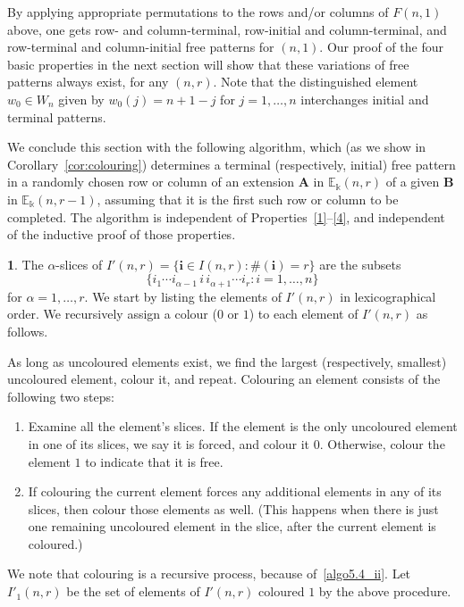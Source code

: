 \documentclass[10pt]{article}
\theoremstyle{definition}
\newtheorem{dynamicenonce}[theorem]{\scaffoldenoncename}
\newenvironment{enonce}[2][]{\def\scaffoldenoncename{#2}\begin{dynamicenonce}}{\end{dynamicenonce}}
\newcommand{\E}{\mathbb{E}}
\newcommand{\bi}{{\boldsymbol{i}}} %
\newcommand{\bA}{\mathbf{A}}
\newcommand{\bB}{\mathbf{B}}
\newenvironment{algorithm}{\begin{enonce}{Algorithm}}{\end{enonce}} %
\begin{document}
By applying appropriate permutations to the rows and/or columns of
$F(n,1)$ above, one gets row- and column-terminal, row-initial and
column-terminal, and row-terminal and column-initial free patterns for
$(n,1)$. Our proof of the four basic properties in the next section
will show that these variations of free patterns always exist, for any
$(n,r)$. Note that the distinguished element $w_0 \in W_n$ given by
$w_0(j) = n+1-j$ for $j = 1, \dots, n$ interchanges initial and
terminal patterns.


We conclude this section with the following algorithm, which (as we
show in Corollary~\ref{cor:colouring}) determines a terminal
(respectively, initial) free pattern in a randomly chosen row or
column of an extension $\bA$ in $\E_\Bbbk(n,r)$ of a given $\bB$ in
$\E_\Bbbk(n,r-1)$, assuming that it is the first such row or column to
be completed. The algorithm is independent of
Properties~\ref{1}--\ref{4}, and independent of the inductive proof of
those properties.

\begin{algorithm}\label{algo}
The $\alpha$-slices of $I'(n,r)=\{\bi \in I(n,r): \#(\bi)=r\}$ are the
subsets
\[
\{i_1 \cdots i_{\alpha-1}\, i\, i_{\alpha+1}\cdots i_r: i = 1, \dots,
n\}
\]
for $\alpha = 1, \dots, r$. We start by listing the elements of
$I'(n,r)$ in lexicographical order. We recursively assign a colour
\textup{(}$0$ or $1$\textup{)} to each element of $I'(n,r)$ as follows.

As long as uncoloured elements exist, we find the largest
\textup{(}respectively, smallest\textup{)} uncoloured element, colour
it, and repeat. Colouring an element consists of the following two
steps:
\begin{enumerate}[label=(\alph*)]
\item\label{algo5.4_i} Examine all the element's slices. If the element is the only
 uncoloured element in one of its slices, we say it is forced, and
 colour it $0$. Otherwise, colour the element $1$ to indicate that it
 is free.
\item\label{algo5.4_ii} If colouring the current element forces any additional elements
 in any of its slices, then colour those elements as
 well. \textup{(}This happens when there is just one remaining
 uncoloured element in the slice, after the current element is
 coloured.\textup{)}
\end{enumerate}
We note that colouring is a recursive process, because of~\ref{algo5.4_ii}. Let $I'_1(n,r)$ be the set of elements of $I'(n,r)$
coloured $1$ by the above procedure.
\end{algorithm}
\end{document}
